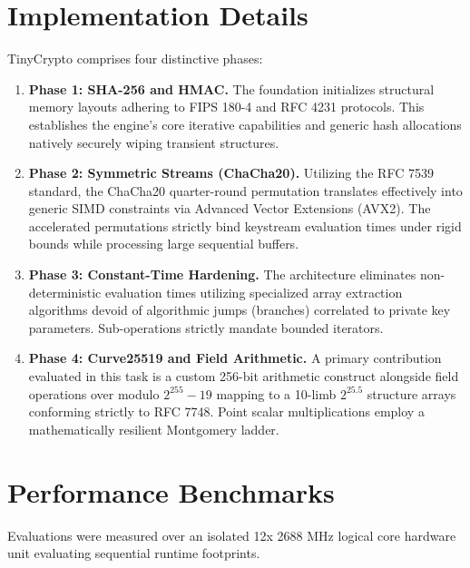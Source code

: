 \documentclass[10pt,twocolumn,letterpaper]{article}
\begin{document}
\section{Implementation Details}
TinyCrypto comprises four distinctive phases:
\begin{enumerate}
    \item \textbf{Phase 1: SHA-256 and HMAC.}
    The foundation initializes structural memory layouts adhering to FIPS 180-4 and RFC 4231 protocols. This establishes the engine's core iterative capabilities and generic hash allocations natively securely wiping transient structures.
    \item \textbf{Phase 2: Symmetric Streams (ChaCha20).}
    Utilizing the RFC 7539 standard, the ChaCha20 quarter-round permutation translates effectively into generic SIMD constraints via Advanced Vector Extensions (AVX2). The accelerated permutations strictly bind keystream evaluation times under rigid bounds while processing large sequential buffers.
    \item \textbf{Phase 3: Constant-Time Hardening.}
    The architecture eliminates non-deterministic evaluation times utilizing specialized array extraction algorithms devoid of algorithmic jumps (branches) correlated to private key parameters. Sub-operations strictly mandate bounded iterators.
    \item \textbf{Phase 4: Curve25519 and Field Arithmetic.}
    A primary contribution evaluated in this task is a custom 256-bit arithmetic construct alongside field operations over modulo $2^{255} - 19$ mapping to a 10-limb $2^{25.5}$ structure arrays conforming strictly to RFC 7748. Point scalar multiplications employ a mathematically resilient Montgomery ladder.
\end{enumerate}

\section{Performance Benchmarks}
Evaluations were measured over an isolated 12x 2688 MHz logical core hardware unit evaluating sequential runtime footprints.
\end{document}
